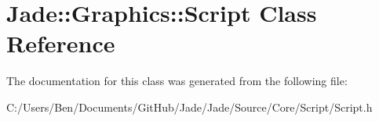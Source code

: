 \hypertarget{class_jade_1_1_graphics_1_1_script}{}\section{Jade\+:\+:Graphics\+:\+:Script Class Reference}
\label{class_jade_1_1_graphics_1_1_script}


The documentation for this class was generated from the following file\+:\begin{DoxyCompactItemize}
\item 
C\+:/\+Users/\+Ben/\+Documents/\+Git\+Hub/\+Jade/\+Jade/\+Source/\+Core/\+Script/Script.\+h\end{DoxyCompactItemize}
